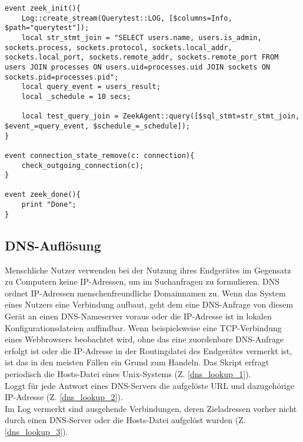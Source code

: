 \begin{lstlisting}[caption={Abfrage und Abgleich der Ports },label={Code_4},consecutivenumbers=false,lastline=77,firstnumber=52,numberblanklines=false,linerange={52-55,62-70,76-77}]
event zeek_init(){
	Log::create_stream(Querytest::LOG, [$columns=Info, $path="querytest"]);
    local str_stmt_join = "SELECT users.name, users.is_admin, sockets.process, sockets.protocol, sockets.local_addr, sockets.local_port, sockets.remote_addr, sockets.remote_port FROM users JOIN processes ON users.uid=processes.uid JOIN sockets ON sockets.pid=processes.pid";
    local query_event = users_result;
    local _schedule = 10 secs;
    
    local test_query_join = ZeekAgent::query([$sql_stmt=str_stmt_join, $event_=query_event, $schedule_=_schedule]);
}

event connection_state_remove(c: connection){
    check_outgoing_connection(c);
}

event zeek_done(){
    print "Done";
}
\end{lstlisting}
\subsection{DNS-Auflösung}
Menschliche Nutzer verwenden bei der Nutzung ihres Endgerätes im Gegensatz zu Computern keine IP-Adressen, um im Suchanfragen zu formulieren. DNS ordnet IP-Adressen menschenfreundliche Domainnamen zu. Wenn das System eines Nutzers eine Verbindung aufbaut, geht dem eine DNS-Anfrage von diesem Gerät an einen DNS-Nameserver voraus oder die IP-Adresse ist in lokalen Konfigurationsdateien auffindbar. Wenn beispielsweise eine TCP-Verbindung eines Webbrowsers beobachtet wird, ohne das eine zuordenbare DNS-Anfrage erfolgt ist oder die IP-Adresse in der Routingdatei des Endgerätes vermerkt ist, ist das in den meisten Fällen ein Grund zum Handeln.
Das Skript erfragt periodisch die Hosts-Datei eines Unix-Systems (Z. \ref{dns_lookup_1}).\\
Loggt für jede Antwort eines DNS-Servers die aufgelöste URL und dazugehörige IP-Adresse (Z. \ref{dns_lookup_2}).\\
Im Log vermerkt sind ausgehende Verbindungen, deren Zieladressen vorher nicht durch einen DNS-Server oder die Hosts-Datei aufgelöst wurden (Z. \ref{dns_lookup_3}).
